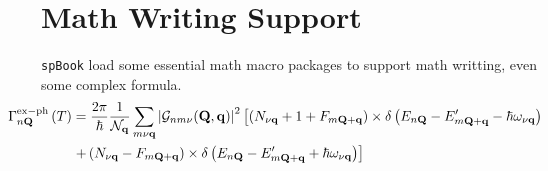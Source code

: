 
    \section{Math Writing Support}
        \texttt{spBook} load some essential math macro packages to support math writting, even some complex formula.
        \begin{align}
            \hspace{-25pt}\Gamma_{n\mathbf{Q}}^{\mathrm{ex-ph}}\left(T\right)&=\frac{2\pi}{\hbar}\frac{1}{\mathcal{N}_\mathbf{q}}\sum_{m\nu\mathbf{q}}\left|\mathcal{G}_{nm\nu}(\mathbf{Q},\mathbf{q})\right|^2\left[\left(N_{\nu\mathbf{q}}+1+F_{m\mathbf{Q}+\mathbf{q}}\right)\times\delta\left(E_{n\mathbf{Q}}-E^\prime_{m\mathbf{Q}+\mathbf{q}}-\hbar\omega_{\nu\mathbf{q}}\right)\right.\nonumber
            \\
            &\left.+\left(N_{\nu\mathbf{q}}-F_{m\mathbf{Q}+\mathbf{q}}\right)\times\delta\left(E_{n\mathbf{Q}}-E^\prime_{m\mathbf{Q}+\mathbf{q}}+\hbar\omega_{\nu\mathbf{q}}\right)\right]
        \end{align}

